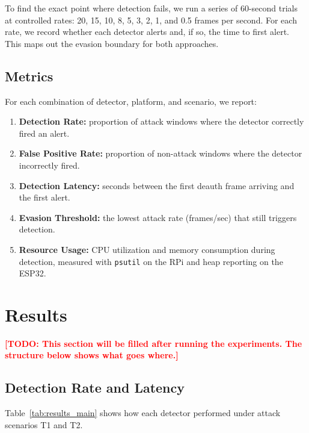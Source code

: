 \documentclass[conference]{IEEEtran}
\newcommand{\placeholder}[1]{\textcolor{red}{\textbf{[TODO: #1]}}}
\begin{document}
To find the exact point where detection fails, we run a series of 60-second trials at controlled rates: 20, 15, 10, 8, 5, 3, 2, 1, and 0.5 frames per second. For each rate, we record whether each detector alerts and, if so, the time to first alert. This maps out the evasion boundary for both approaches.

\subsection{Metrics}

For each combination of detector, platform, and scenario, we report:

\begin{enumerate}
    \item \textbf{Detection Rate:} proportion of attack windows where the detector correctly fired an alert.
    \item \textbf{False Positive Rate:} proportion of non-attack windows where the detector incorrectly fired.
    \item \textbf{Detection Latency:} seconds between the first deauth frame arriving and the first alert.
    \item \textbf{Evasion Threshold:} the lowest attack rate (frames/sec) that still triggers detection.
    \item \textbf{Resource Usage:} CPU utilization and memory consumption during detection, measured with \texttt{psutil} on the RPi and heap reporting on the ESP32.
\end{enumerate}

\section{Results}
\label{sec:results}

\placeholder{This section will be filled after running the experiments. The structure below shows what goes where.}

\subsection{Detection Rate and Latency}

Table~\ref{tab:results_main} shows how each detector performed under attack scenarios T1 and T2.
\end{document}
